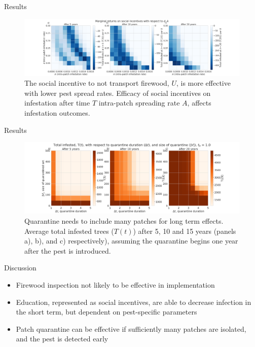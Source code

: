 \documentclass{beamer}
\begin{document}
\begin{frame}{Results}
    \begin{figure}
        \includegraphics[width=\textwidth]{firewood/A_v_ct_v_d_marginal_gain.png}
        \caption{The social incentive to not transport firewood, $U$, is more effective with lower pest spread rates. Efficacy of social incentives on infestation after time $T$ intra-patch spreading rate $A$, affects infestation outcomes.}
    \end{figure}
\end{frame}
\begin{frame}{Results}
    \begin{figure}
        \includegraphics[width=\textwidth]{firewood/node_quarantine_plot_1.0.png}
        \caption{Quarantine needs to include many patches for long term effects. Average total infested trees ($T(t)$) after 5, 10 and 15 years (panels a), b), and c) respectively), assuming the quarantine begins one year after the pest is introduced.}
    \end{figure}
\end{frame}

\begin{frame}{Discussion}
    \begin{itemize}
        \item Firewood inspection not likely to be effective in implementation
        \item Education, represented as social incentives, are able to decrease infection in the short term, but dependent on pest-specific parameters
        \item Patch quarantine can be effective if sufficiently many patches are isolated, and the pest is detected early 
    \end{itemize}
\end{frame}
\end{document}

